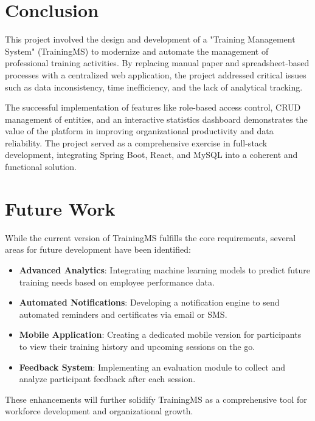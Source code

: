 \section{Conclusion}
This project involved the design and development of a "Training Management System" (TrainingMS) to modernize and automate the management of professional training activities. By replacing manual paper and spreadsheet-based processes with a centralized web application, the project addressed critical issues such as data inconsistency, time inefficiency, and the lack of analytical tracking. 

The successful implementation of features like role-based access control, CRUD management of entities, and an interactive statistics dashboard demonstrates the value of the platform in improving organizational productivity and data reliability. The project served as a comprehensive exercise in full-stack development, integrating Spring Boot, React, and MySQL into a coherent and functional solution.

\section{Future Work}
While the current version of TrainingMS fulfills the core requirements, several areas for future development have been identified:
\begin{itemize}
    \item \textbf{Advanced Analytics}: Integrating machine learning models to predict future training needs based on employee performance data.
    \item \textbf{Automated Notifications}: Developing a notification engine to send automated reminders and certificates via email or SMS.
    \item \textbf{Mobile Application}: Creating a dedicated mobile version for participants to view their training history and upcoming sessions on the go.
    \item \textbf{Feedback System}: Implementing an evaluation module to collect and analyze participant feedback after each session.
\end{itemize}
These enhancements will further solidify TrainingMS as a comprehensive tool for workforce development and organizational growth.
